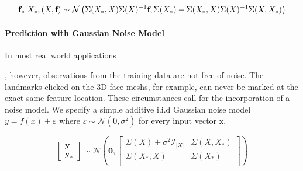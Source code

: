 \begin{equation}
    \textbf{f}_{*}\vert X_{*},(X,\textbf{f}) \sim \mathcal{N}\left(\Sigma(X_{*},X)\Sigma(X)^{-1}\textbf{f},\\\Sigma(X_{*})-\Sigma(X_{*},X)\Sigma(X)^{-1}\Sigma(X,X_{*})\right)
\end{equation}

\paragraph{Prediction with Gaussian Noise Model}
In most real world applications , however, observations from the training data are not free of noise. The landmarks clicked on the 3D face meshs, for example, can never be marked at the exact same feature location. These circumstances call for the incorporation of a noise model. We specify a simple additive i.i.d Gaussian noise model $y = f(x) + \varepsilon$ where $\varepsilon \sim \mathcal{N}(0, \sigma^2)$ for every input vector x. 

\begin{equation}
\begin{bmatrix}\textbf{y}\\\textbf{y}_{*}\end{bmatrix}
\sim \mathcal{N}\left(\textbf{0},
\begin{bmatrix}
    \Sigma(X) + \sigma^2\mathcal{I}_{\left|X \right|} & \Sigma(X,X_{*})\\
    \Sigma(X_{*},X) & \Sigma(X_{*})\\
\end{bmatrix}
\right)
\end{equation}


